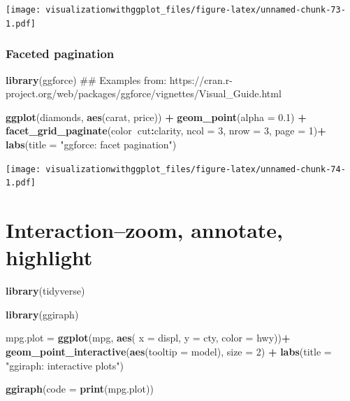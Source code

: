 \documentclass[]{krantz}
\makeatletter
\newenvironment{Shaded}{\begin{snugshade}}{\end{snugshade}}
\newcommand{\KeywordTok}[1]{\textcolor[rgb]{0.13,0.29,0.53}{\textbf{#1}}}
\newcommand{\DataTypeTok}[1]{\textcolor[rgb]{0.13,0.29,0.53}{#1}}
\newcommand{\DecValTok}[1]{\textcolor[rgb]{0.00,0.00,0.81}{#1}}
\newcommand{\FloatTok}[1]{\textcolor[rgb]{0.00,0.00,0.81}{#1}}
\newcommand{\StringTok}[1]{\textcolor[rgb]{0.31,0.60,0.02}{#1}}
\newcommand{\OperatorTok}[1]{\textcolor[rgb]{0.81,0.36,0.00}{\textbf{#1}}}
\newcommand{\NormalTok}[1]{#1}
\newenvironment{kframe}{%
\medskip{}
\setlength{\fboxsep}{.8em}
 \def\at@end@of@kframe{}%
 \ifinner\ifhmode%
  \def\at@end@of@kframe{\end{minipage}}%
  \begin{minipage}{\columnwidth}%
 \fi\fi%
 \def\FrameCommand##1{\hskip\@totalleftmargin \hskip-\fboxsep
 \colorbox{shadecolor}{##1}\hskip-\fboxsep
     \hskip-\linewidth \hskip-\@totalleftmargin \hskip\columnwidth}%
 \MakeFramed {\advance\hsize-\width
   \@totalleftmargin\z@ \linewidth\hsize
   \@setminipage}}%
 {\par\unskip\endMakeFramed%
 \at@end@of@kframe}
\renewenvironment{Shaded}{\begin{kframe}}{\end{kframe}}
\theoremstyle{definition}
\theoremstyle{definition}
\theoremstyle{definition}
\theoremstyle{remark}
\makeatother
\begin{document}
\texttt{[image: visualizationwithggplot\_files/figure-latex/unnamed-chunk-73-1.pdf]}

\subsection{Faceted pagination}\label{faceted-pagination}

\begin{Shaded}
\begin{Highlighting}[]
\KeywordTok{library}\NormalTok{(ggforce)}
\NormalTok{## Examples from: https://cran.r-project.org/web/packages/ggforce/vignettes/Visual_Guide.html}


\KeywordTok{ggplot}\NormalTok{(diamonds, }\KeywordTok{aes}\NormalTok{(carat, price)) }\OperatorTok{+}
\StringTok{  }\KeywordTok{geom_point}\NormalTok{(}\DataTypeTok{alpha =} \FloatTok{0.1}\NormalTok{) }\OperatorTok{+}
\StringTok{  }\KeywordTok{facet_grid_paginate}\NormalTok{(color}\OperatorTok{~}\NormalTok{cut}\OperatorTok{:}\NormalTok{clarity, }\DataTypeTok{ncol =} \DecValTok{3}\NormalTok{, }\DataTypeTok{nrow =} \DecValTok{3}\NormalTok{, }\DataTypeTok{page =} \DecValTok{1}\NormalTok{)}\OperatorTok{+}
\StringTok{  }\KeywordTok{labs}\NormalTok{(}\DataTypeTok{title =} \StringTok{"ggforce: facet pagination"}\NormalTok{)}
\end{Highlighting}
\end{Shaded}

\texttt{[image: visualizationwithggplot\_files/figure-latex/unnamed-chunk-74-1.pdf]}

\cleardoublepage 

\chapter{Interaction--zoom, annotate, highlight}\label{Interaction}

\begin{Shaded}
\begin{Highlighting}[]
\KeywordTok{library}\NormalTok{(tidyverse)}
\end{Highlighting}
\end{Shaded}

\begin{Shaded}
\begin{Highlighting}[]
\KeywordTok{library}\NormalTok{(ggiraph)}

\NormalTok{mpg.plot =}\StringTok{  }\KeywordTok{ggplot}\NormalTok{(mpg, }\KeywordTok{aes}\NormalTok{( }\DataTypeTok{x =}\NormalTok{ displ, }\DataTypeTok{y =}\NormalTok{ cty, }\DataTypeTok{color =}\NormalTok{ hwy))}\OperatorTok{+}\StringTok{     }\KeywordTok{geom_point_interactive}\NormalTok{(}\KeywordTok{aes}\NormalTok{(}\DataTypeTok{tooltip =}\NormalTok{ model), }\DataTypeTok{size =} \DecValTok{2}\NormalTok{) }\OperatorTok{+}\StringTok{    }\KeywordTok{labs}\NormalTok{(}\DataTypeTok{title =} \StringTok{"ggiraph: interactive plots"}\NormalTok{)}
    
\KeywordTok{ggiraph}\NormalTok{(}\DataTypeTok{code =}  \KeywordTok{print}\NormalTok{(mpg.plot))}
\end{Highlighting}
\end{Shaded}
\end{document}
